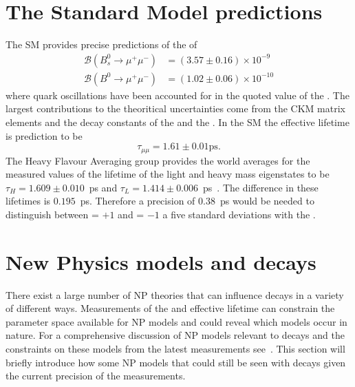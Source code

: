 \section{The Standard Model predictions}
\label{sec:SM_predictions}

The SM provides precise predictions of the \bmumu \BFs of~\cite{Bobeth:2013uxa, Aoki:2016frl, Fleischer:2017ltw}
\begin{align}
\mathcal{B}(B^0_{s} \to \mu^+ \mu^-)& = (3.57 \pm 0.16) \times 10^{-9}\\
\mathcal{B}(B^0 \to\mu^+ \mu^-)& = (1.02 \pm 0.06) \times 10^{-10}
\end{align}
where quark oscillations have been accounted for in the quoted value of the \bsmumu \BF. The largest contributions to the theoritical uncertainties come from the CKM matrix elements and the decay constants of the \bs and the \bd.
In the SM the \bsmumu effective lifetime is prediction to be~\cite{Fleischer:2017ltw}
\begin{equation}
\tau_{\mu\mu} = 1.61 \pm 0.01 \mathrm{ps}.
\end{equation}
The Heavy Flavour Averaging group provides the world averages for the measured values of the lifetime of the light and heavy \bs mass eigenstates to be $\tau_{H} = 1.609 \pm 0.010$~ps and $\tau_{L} = 1.414 \pm 0.006$~ps~\cite{Amhis:2016xyh}.
The difference in these lifetimes is $0.195$~ps.
Therefore a precision of 0.38~ps would be needed to distinguish between \ADG = $+1$ and \ADG = $-1$ a five standard deviations with the \EL. 



\section{New Physics models and \bmumu decays}
\label{sec:NPmodels}
There exist a large number of NP theories that can influence \bmumu decays in a variety of different ways. Measurements of the \bmumu \BFs and \bsmumu effective lifetime can constrain the parameter space available for NP models and could reveal which models occur in nature. For a comprehensive discussion of NP models relevant to \bmumu decays and the constraints on these models from the latest \BF measurements see~\cite{}. This section will briefly introduce how some NP models that could still be seen with \bmumu decays given the current precision of the \BF measurements. %

